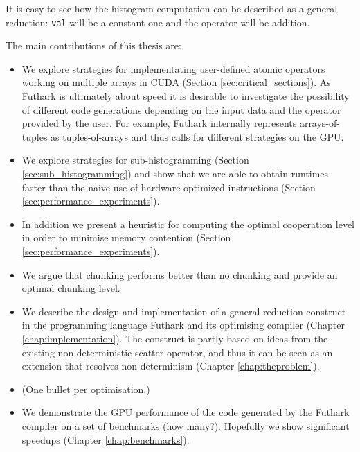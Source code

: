 It is easy to see how the histogram computation can be
described as a general reduction: \texttt{val} will be a
constant one and the operator will be addition.


The main contributions of this thesis are: 
%
\begin{itemize}
  \item We explore strategies for implementating
    user-defined atomic operators working on multiple arrays
    in CUDA (Section \ref{sec:critical_sections}). As
    Futhark is ultimately about speed it is desirable to
    investigate the possibility of different code
    generations depending on the input data and the operator
    provided by the user. For example, Futhark internally
    represents arrays-of-tuples as tuples-of-arrays and thus
    calls for different strategies on the GPU.

  \item We explore strategies for sub-histogramming (Section
    \ref{sec:sub_histogramming}) and show that we are able
    to obtain runtimes faster than the naive use of hardware
    optimized instructions (Section
    \ref{sec:performance_experiments}).

  \item In addition we present a heuristic for computing the
    optimal cooperation level in order to minimise memory
    contention (Section \ref{sec:performance_experiments}).

  \item We argue that chunking performs better than no
    chunking and provide an optimal chunking level. 

  \item We describe the design and implementation of a
    general reduction construct in the programming language
    Futhark and its optimising compiler (Chapter
    \ref{chap:implementation}). The construct is partly
    based on ideas from the existing non-deterministic
    scatter operator, and thus it can be seen as an
    extension that resolves non-determinism (Chapter
    \ref{chap:theproblem}).

  \item (One bullet per optimisation.)

  \item We demonstrate the GPU performance of the code
    generated by the Futhark compiler on a set of benchmarks
    (how many?). Hopefully we show significant
    speedups (Chapter \ref{chap:benchmarks}).
\end{itemize}
%
